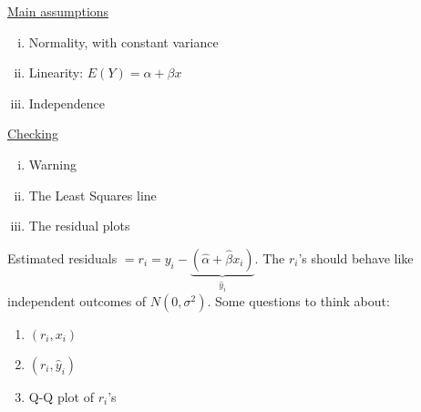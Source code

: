 \underline{Main assumptions}
\begin{enumerate}[(i)]
    \item Normality, with constant variance
    \item Linearity: $ E(Y)=\alpha+\beta x $
    \item Independence
\end{enumerate}
\underline{Checking}
\begin{enumerate}[(i)]
    \item Warning
    \item The Least Squares line
    \item The residual plots
\end{enumerate}
Estimated residuals $ =r_i=y_i-\underbrace{(\hat{\alpha}+\hat{\beta}x_i)}_{\hat{y}_i} $.
The $ r_i $'s should behave like independent outcomes of $ N(0,\sigma^2) $.
Some questions to think about:
\begin{enumerate}[(1)]
    \item $ (r_i,x_i) $
    \item $ (r_i,\hat{y}_i) $
    \item Q-Q plot of $ r_i $'s
\end{enumerate}
